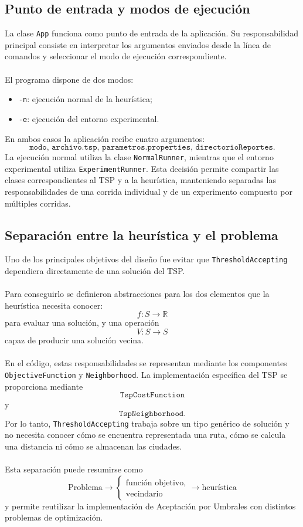 \documentclass[12pt]{article}
\begin{document}
\subsection{Punto de entrada y modos de ejecución}

La clase \texttt{App} funciona como punto de entrada de la aplicación. Su
responsabilidad principal consiste en interpretar los argumentos enviados
desde la línea de comandos y seleccionar el modo de ejecución
correspondiente.
\\\\
El programa dispone de dos modos:
\begin{itemize}
    \item \texttt{-n}: ejecución normal de la heurística;
    \item \texttt{-e}: ejecución del entorno experimental.
\end{itemize}
En ambos casos la aplicación recibe cuatro argumentos:
\[
\texttt{
modo,\ archivo.tsp,\ parametros.properties,\ directorioReportes
}.
\]
La ejecución normal utiliza la clase \texttt{NormalRunner}, mientras que
el entorno experimental utiliza \texttt{ExperimentRunner}. Esta decisión
permite compartir las clases correspondientes al TSP y a la heurística,
manteniendo separadas las responsabilidades de una corrida individual y de
un experimento compuesto por múltiples corridas.

\subsection{Separación entre la heurística y el problema}

Uno de los principales objetivos del diseño fue evitar que
\texttt{ThresholdAccepting} dependiera directamente de una solución del
TSP.
\\\\
Para conseguirlo se definieron abstracciones para los dos elementos que la
heurística necesita conocer:
\[
    f:S\longrightarrow\mathbb{R}
\]
para evaluar una solución, y una operación
\[
    V:S\longrightarrow S
\]
capaz de producir una solución vecina.
\\\\
En el código, estas responsabilidades se representan mediante los
componentes \texttt{ObjectiveFunction} y \texttt{Neighborhood}. La
implementación específica del TSP se proporciona mediante
\[
\texttt{TspCostFunction}
\]
y
\[
\texttt{TspNeighborhood}.
\]
Por lo tanto, \texttt{ThresholdAccepting} trabaja sobre un tipo genérico de
solución y no necesita conocer cómo se encuentra representada una ruta, cómo
se calcula una distancia ni cómo se almacenan las ciudades.
\\\\
Esta separación puede resumirse como
\[
\boxed{
\text{Problema}
\longrightarrow
\begin{cases}
\text{función objetivo},\\
\text{vecindario}
\end{cases}
\longrightarrow
\text{heurística}
}
\]
y permite reutilizar la implementación de Aceptación por Umbrales con
distintos problemas de optimización.
\end{document}
